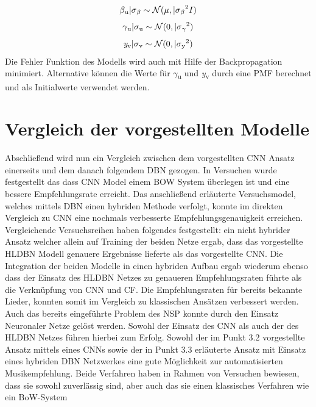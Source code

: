 \documentclass[twosided,a4,10pt]{article}
\begin{document}
\begin{multicols}{2}
		\begin{equation*}
		\centering
		\beta\textsubscript{u}|\sigma\textsubscript{$\beta$}\sim\mathcal{N}(\mu,|\sigma\textsubscript{$\beta$}\textsuperscript{2}I)
		\end{equation*}
		\begin{equation*}
		\centering
		\gamma\textsubscript{u}|\sigma\textsubscript{u}\sim\mathcal{N}(0,|\sigma\textsubscript{$\gamma$}\textsuperscript{2})
		\end{equation*}
		\begin{equation*}
		\centering
		\textit{y}\textsubscript{v}|\sigma\textsubscript{v}\sim\mathcal{N}(0,|\sigma\textsubscript{y}\textsuperscript{2})
		\end{equation*}\newline
		Die Fehler Funktion des Modells wird auch mit Hilfe der Backpropagation minimiert. Alternative können  die Werte für $\gamma$\textsubscript{u} und \textit{y}\textsubscript{v} durch eine PMF berechnet und als Initialwerte verwendet werden. \cite{wang}
		\section{Vergleich der vorgestellten Modelle}
		Abschließend wird nun ein Vergleich zwischen dem vorgestellten CNN Ansatz einerseits und dem danach folgendem DBN gezogen. In Versuchen \cite{oord} wurde festgestellt das dass CNN Model einem BOW System überlegen ist und eine bessere Empfehlungsrate erreicht. Das anschließend erläuterte  Versuchsmodel, welches mittels DBN einen hybriden Methode verfolgt, konnte im direkten Vergleich zu CNN eine nochmals verbesserte Empfehlungsgenauigkeit erreichen. Vergleichende Versuchsreihen \cite{wang} haben folgendes festgestellt: ein nicht hybrider Ansatz welcher allein auf Training der beiden Netze ergab, dass das vorgestellte HLDBN Modell genauere Ergebnisse lieferte als das vorgestellte CNN. Die Integration der beiden Modelle in einen hybriden Aufbau ergab wiederum ebenso dass der Einsatz des HLDBN Netzes zu genaueren Empfehlungsraten führte als die Verknüpfung von CNN und CF. Die Empfehlungsraten für bereits bekannte Lieder, konnten somit im Vergleich zu klassischen Ansätzen verbessert werden. Auch das bereits eingeführte Problem des NSP konnte durch den Einsatz Neuronaler Netze gelöst werden.  Sowohl der Einsatz des CNN als auch der des HLDBN Netzes führen hierbei zum Erfolg.
		Sowohl der im Punkt 3.2 vorgestellte Ansatz mittels eines CNNs sowie der in Punkt 3.3 erläuterte Ansatz mit Einsatz eines hybriden DBN Netzwerkes eine gute Möglichkeit zur automatisierten Musikempfehlung. Beide Verfahren haben in Rahmen von Versuchen bewiesen, dass sie sowohl zuverlässig sind, aber auch das sie einen klassisches Verfahren wie ein BoW-System 
		
		
	\end{multicols}
\end{document}
